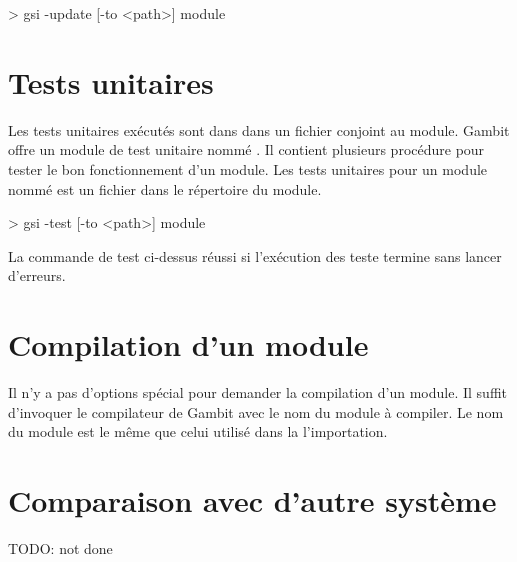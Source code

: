 \begin{center}
  \begin{mplisting}{0.8}
> gsi -update [-to <path>] module
\end{mplisting}
\end{center}

\section{Tests unitaires}
Les tests unitaires exécutés sont dans dans un fichier conjoint au module.
Gambit offre un module de test unitaire nommé . Il
contient plusieurs procédure pour tester le bon fonctionnement d'un module.
Les tests unitaires pour un module nommé  est un fichier
 dans le répertoire du module.

\begin{center}
  \begin{mplisting}{0.8}
> gsi -test [-to <path>] module
\end{mplisting}
\end{center}

La commande de test ci-dessus réussi si l'exécution des teste termine sans
lancer d'erreurs.


\section{Compilation d'un module}
Il n'y a pas d'options spécial pour demander la compilation d'un module.
Il suffit d'invoquer le compilateur de Gambit avec le nom du module
à compiler. Le nom du module est le même que celui utilisé dans la
l'importation.



\section{Comparaison avec d'autre système}

TODO: not done

